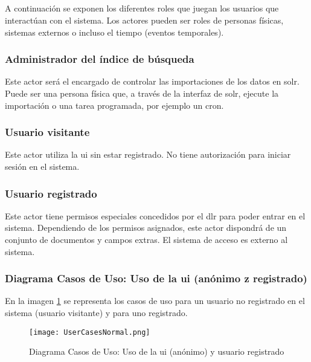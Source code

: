 \subsection{}
A continuación se exponen los diferentes roles que juegan los usuarios que interactúan con el sistema. Los actores pueden ser roles de personas físicas, sistemas externos o incluso el tiempo (eventos temporales).

\subsubsection{Administrador del índice de búsqueda}
Este actor será el encargado de controlar las importaciones de los datos en \gls{solr}. Puede ser una persona física que, a través de la interfaz de \gls{solr}, ejecute la importación o una tarea programada, por ejemplo un \gls{cron}.

\subsubsection{Usuario visitante}
\label{subsubsection:visitante}
Este actor utiliza la \gls{ui} sin estar registrado. No tiene autorización para iniciar sesión en el sistema. 

\subsubsection{Usuario registrado}
Este actor tiene permisos especiales concedidos por el \gls{dlr} para poder entrar en el sistema. Dependiendo de los permisos asignados, este actor dispondrá de un conjunto de documentos y campos extras. El sistema de acceso es externo al sistema.

\subsubsection{Diagrama Casos de Uso: Uso de la \gls{ui} (anónimo z registrado)}
En la imagen \ref{image:cuuiano} se representa los casos de uso para un usuario no registrado en el sistema (usuario visitante) y para uno registrado.

\begin{figure}[h!]
  \centering
     \texttt{[image: UserCasesNormal.png]}
  \caption{Diagrama Casos de Uso: Uso de la \gls{ui} (anónimo) y usuario registrado}
  \label{image:cuuiano}
\end{figure}

\begin{comment}
\subsubsection{Diagrama Casos de Uso: Uso de la \gls{ui}}
En la imagen \ref{image:cuuireg} se representa los casos de uso para un usuario registrado en el sistema.

\begin{figure}[h!]
  \centering
	\missingfigure{En libreta, Caso uso registrado}
  \caption{Diagrama Casos de Uso: Uso de la \gls{ui}}
  \label{image:cuuireg}
\end{figure}
\end{comment}
